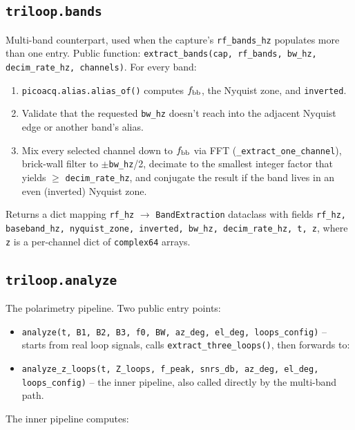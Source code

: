 \documentclass[11pt]{article}
\begin{document}
\subsection{\texttt{triloop.bands}}

Multi-band counterpart, used when the capture's
\texttt{rf\_bands\_hz} populates more than one entry.  Public
function: \texttt{extract\_bands(cap, rf\_bands, bw\_hz, decim\_rate\_hz, channels)}.
For every band:

\begin{enumerate}\itemsep=2pt
\item \texttt{picoacq.alias.alias\_of()} computes
      $f_{\rm bb}$, the Nyquist zone, and \texttt{inverted}.
\item Validate that the requested \texttt{bw\_hz} doesn't reach into
      the adjacent Nyquist edge or another band's alias.
\item Mix every selected channel down to $f_{\rm bb}$ via FFT
      (\texttt{\_extract\_one\_channel}), brick-wall filter to
      $\pm$\texttt{bw\_hz}/2, decimate to the smallest integer factor
      that yields $\geq$ \texttt{decim\_rate\_hz}, and conjugate the
      result if the band lives in an even (inverted) Nyquist zone.
\end{enumerate}

Returns a dict mapping \texttt{rf\_hz} $\to$ \texttt{BandExtraction}
dataclass with fields
\texttt{rf\_hz, baseband\_hz, nyquist\_zone, inverted, bw\_hz,
decim\_rate\_hz, t, z}, where \texttt{z} is a per-channel dict of
\texttt{complex64} arrays.

\subsection{\texttt{triloop.analyze}}

The polarimetry pipeline.  Two public entry points:

\begin{itemize}\itemsep=2pt
\item \texttt{analyze(t, B1, B2, B3, f0, BW, az\_deg, el\_deg, loops\_config)}
      -- starts from real loop signals, calls
      \texttt{extract\_three\_loops()}, then forwards to:
\item \texttt{analyze\_z\_loops(t, Z\_loops, f\_peak, snrs\_db, az\_deg, el\_deg, loops\_config)}
      -- the inner pipeline, also called directly by the multi-band
      path.
\end{itemize}

The inner pipeline computes:
\end{document}
